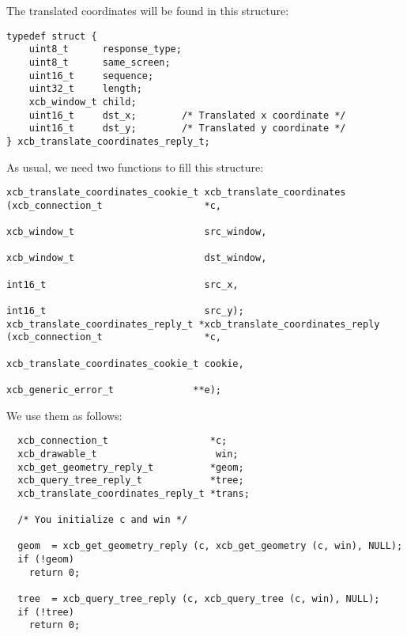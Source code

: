 \documentclass[12pt,oneside,titlepage]{book}
\begin{document}
\begin{enumerate}
\begin{enumerate}
    The translated coordinates will be found in this structure:

\begin{verbatim}
typedef struct {
    uint8_t      response_type;
    uint8_t      same_screen;
    uint16_t     sequence;
    uint32_t     length;
    xcb_window_t child;
    uint16_t     dst_x;        /* Translated x coordinate */
    uint16_t     dst_y;        /* Translated y coordinate */
} xcb_translate_coordinates_reply_t;
\end{verbatim}

    As usual, we need two functions to fill this structure:

\begin{verbatim}
xcb_translate_coordinates_cookie_t xcb_translate_coordinates       (xcb_connection_t                  *c,
                                                                    xcb_window_t                       src_window,
                                                                    xcb_window_t                       dst_window,
                                                                    int16_t                            src_x,
                                                                    int16_t                            src_y);
xcb_translate_coordinates_reply_t *xcb_translate_coordinates_reply (xcb_connection_t                  *c,
                                                                    xcb_translate_coordinates_cookie_t cookie,
                                                                    xcb_generic_error_t              **e);
\end{verbatim}

    We use them as follows:

\begin{verbatim}
  xcb_connection_t                  *c;
  xcb_drawable_t                     win;
  xcb_get_geometry_reply_t          *geom;
  xcb_query_tree_reply_t            *tree;
  xcb_translate_coordinates_reply_t *trans;

  /* You initialize c and win */

  geom  = xcb_get_geometry_reply (c, xcb_get_geometry (c, win), NULL);
  if (!geom)
    return 0;

  tree  = xcb_query_tree_reply (c, xcb_query_tree (c, win), NULL);
  if (!tree)
    return 0;


\end{verbatim}
\end{enumerate}
\end{enumerate}
\end{document}
